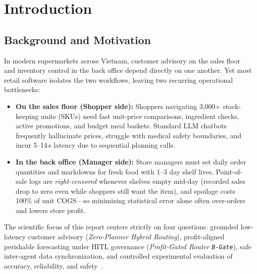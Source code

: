 \chapter{Introduction}

\section{Background and Motivation}

In modern supermarkets across Vietnam, customer advisory on the sales floor and inventory control in the back office depend directly on one another. Yet most retail software isolates the two workflows, leaving two recurring operational bottlenecks:
\begin{itemize}
    \item \textbf{On the sales floor (Shopper side):} Shoppers navigating 3,000+ stock-keeping units (SKUs) need fast unit-price comparisons, ingredient checks, active promotions, and budget meal baskets. Standard LLM chatbots frequently hallucinate prices, struggle with medical safety boundaries, and incur 5--14\,s latency due to sequential planning calls.
    \item \textbf{In the back office (Manager side):} Store managers must set daily order quantities and markdowns for fresh food with 1--3 day shelf lives. Point-of-sale logs are \emph{right-censored} whenever shelves empty mid-day (recorded sales drop to zero even while shoppers still want the item), and spoilage costs 100\% of unit COGS---so minimizing statistical error alone often over-orders and lowers store profit.
\end{itemize}


The scientific focus of this report centers strictly on four questions: grounded low-latency customer advisory (\emph{Zero-Planner Hybrid Routing}), profit-aligned perishable forecasting under HITL governance (\emph{Profit-Gated Router \texttt{B-Gate}}), safe inter-agent data synchronization, and controlled experimental evaluation of accuracy, reliability, and safety~\cite{retail_ai_repo,ops_chest_repo,ops_retail_bridge_repo}.

